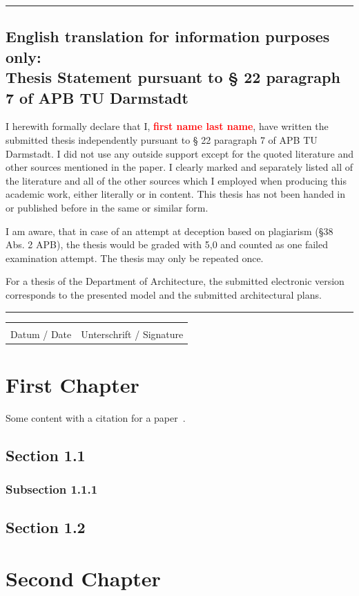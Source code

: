 \documentclass{cacthesis}
\begin{document}
	\vspace{10pt}
	\hrule
	
	\section*{English translation for information purposes only:\\Thesis Statement pursuant to § 22 paragraph 7 of APB TU Darmstadt}
	
	I herewith formally declare that I, \textcolor{red}{\textbf{first name last name}}, have written the submitted thesis independently pursuant to § 22 paragraph 7 of APB TU Darmstadt. I did not use any outside support except for the quoted literature and other sources mentioned in the paper. I clearly marked and separately listed all of the literature and all of the other sources which I employed when producing this academic work, either literally or in content. This thesis has not been handed in or published before in the same or similar form.
	
	I am aware, that in case of an attempt at deception based on plagiarism (§38 Abs. 2 APB), the thesis would be graded with 5,0 and counted as one failed examination attempt. The thesis may only be repeated once.
	
	For a thesis of the Department of Architecture, the submitted electronic version corresponds to the presented model and the submitted architectural plans.
	
	\vspace{10pt}
	\hrule
	\vspace{70pt}
	
	\noindent\begin{tabular}{l@{\hskip 1in}l}
		\makebox[1.8in]{\hrulefill} & \makebox[3.5in]{\hrulefill}\\
		Datum / Date & Unterschrift / Signature
	\end{tabular}

	\newpage

	

	\tableofcontents
	
	\mainmatter
	
	\chapter{First Chapter}
		Some content with a citation for a paper~\cite{diffie1976new}.
		\section{Section 1.1}
		\subsection{Subsection 1.1.1}
		\section{Section 1.2}
		
	\chapter{Second Chapter}
	
	
	
	
	\appendix
\end{document}
